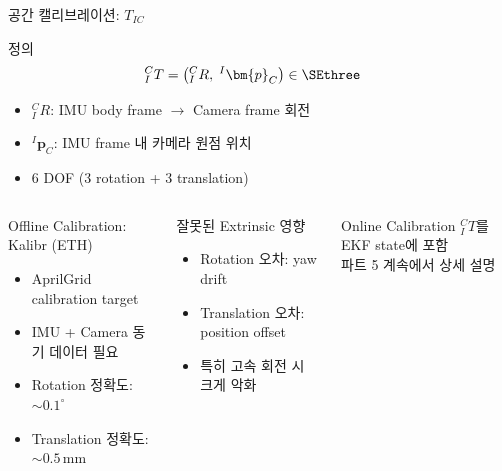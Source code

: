 \begin{frame}[shrink=20]{공간 캘리브레이션: $T_{IC}$}
  \begin{block}{정의}
    \begin{align*}
      {}^C_I T &= \bigl({}^C_I R,\; {}^I\bm{p}_C\bigr) \in \SEthree
    \end{align*}
    \begin{itemize}
      \item ${}^C_I R$: IMU body frame $\to$ Camera frame 회전
      \item ${}^I\bm{p}_C$: IMU frame 내 카메라 원점 위치
      \item 6 DOF (3 rotation + 3 translation)
    \end{itemize}
  \end{block}
  \begin{columns}[T]
      \begin{block}{Offline Calibration: Kalibr (ETH)}
        \begin{itemize}
          \item AprilGrid calibration target
          \item IMU + Camera 동기 데이터 필요
          \item Rotation 정확도: $\sim 0.1^\circ$
          \item Translation 정확도: $\sim 0.5$\,mm
        \end{itemize}
      \end{block}
      \begin{alertblock}{잘못된 Extrinsic 영향}
        \begin{itemize}
          \item Rotation 오차: yaw drift
          \item Translation 오차: position offset
          \item 특히 고속 회전 시 크게 악화
        \end{itemize}
      \end{alertblock}
      \begin{exampleblock}{Online Calibration}
        ${}^C_I T$를 EKF state에 포함\\
        파트 5 계속에서 상세 설명
      \end{exampleblock}
  \end{columns}
\end{frame}


